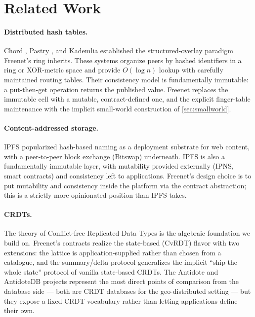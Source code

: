 \section{Related Work}
\label{sec:related}

\paragraph{Distributed hash tables.} Chord \citep{stoica2001chord}, Pastry \citep{rowstron2001pastry}, and Kademlia \citep{maymounkov2002kademlia} established the structured-overlay paradigm Freenet's ring inherits. These systems organize peers by hashed identifiers in a ring or XOR-metric space and provide $O(\log n)$ lookup with carefully maintained routing tables. Their consistency model is fundamentally immutable: a put-then-get operation returns the published value. Freenet replaces the immutable cell with a mutable, contract-defined one, and the explicit finger-table maintenance with the implicit small-world construction of \cref{sec:smallworld}.

\paragraph{Content-addressed storage.} IPFS \citep{benet2014ipfs} popularized hash-based naming as a deployment substrate for web content, with a peer-to-peer block exchange (Bitswap) underneath. IPFS is also a fundamentally immutable layer, with mutability provided externally (IPNS, smart contracts) and consistency left to applications. Freenet's design choice is to put mutability and consistency inside the platform via the contract abstraction; this is a strictly more opinionated position than IPFS takes.

\paragraph{CRDTs.} The theory of Conflict-free Replicated Data Types \citep{shapiro2011crdt} is the algebraic foundation we build on. Freenet's contracts realize the state-based (CvRDT) flavor with two extensions: the lattice is application-supplied rather than chosen from a catalogue, and the summary/delta protocol generalizes the implicit ``ship the whole state'' protocol of vanilla state-based CRDTs. The Antidote \citep{akkoorath2016cure} and AntidoteDB \citep{antidote} projects represent the most direct points of comparison from the database side --- both are CRDT databases for the geo-distributed setting --- but they expose a fixed CRDT vocabulary rather than letting applications define their own.

